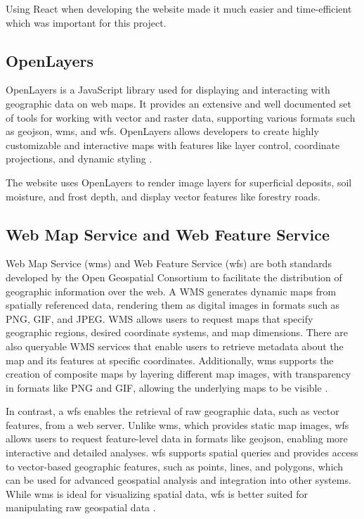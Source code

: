 Using React when developing the website made it much easier and time-efficient which was important for this project. 

\subsection{OpenLayers}

OpenLayers is a JavaScript library used for displaying and interacting with geographic data on web maps. It provides an extensive and well documented set of tools for working with vector and raster data, supporting various formats such as \Gls{geojson}, \Gls{wms}, and \Gls{wfs}. OpenLayers allows developers to create highly customizable and interactive maps with features like layer control, coordinate projections, and dynamic styling \cite{openlayers}.

The website uses OpenLayers to render image layers for \gls{superficial deposit}s, soil moisture, and \gls{frost} depth, and display vector features like forestry roads.  

\subsection{Web Map Service and Web Feature Service}

Web Map Service (\Gls{wms}) and Web Feature Service (\Gls{wfs}) are both standards developed by the Open Geospatial Consortium to facilitate the distribution of geographic information over the web. A WMS generates dynamic maps from spatially referenced data, rendering them as digital images in formats such as PNG, GIF, and JPEG. WMS allows users to request maps that specify geographic regions, desired coordinate systems, and map dimensions. There are also queryable WMS services that enable users to retrieve metadata about the map and its features at specific coordinates. Additionally, \Gls{wms} supports the creation of composite maps by layering different map images, with transparency in formats like PNG and GIF, allowing the underlying maps to be visible \cite{ogc2006wms}.

In contrast, a \Gls{wfs} enables the retrieval of raw geographic data, such as vector features, from a web server. Unlike \Gls{wms}, which provides static map images, \Gls{wfs} allows users to request feature-level data in formats like \Gls{geojson}, enabling more interactive and detailed analyses. \Gls{wfs} supports spatial queries and provides access to vector-based geographic features, such as points, lines, and polygons, which can be used for advanced geospatial analysis and integration into other systems. While \Gls{wms} is ideal for visualizing spatial data, \Gls{wfs} is better suited for manipulating raw geospatial data \cite{ogc2005wfs}.


